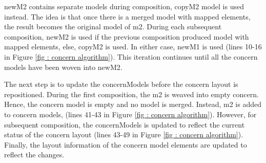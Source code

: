 newM2 contains separate models during composition, copyM2 model is used instead. The idea is that once there is a merged model with mapped elements, the result becomes the original model of m2. During each subsequent composition, newM2 is used if the previous composition produced model with mapped elements, else, copyM2 is used. In either case, newM1 is used (lines 10-16 in Figure  \ref{fig : concern algorithm}). This iteration continues until all the concern models have been woven into newM2.

The next step is to update the concernModels before the concern layout is repositioned. During the first composition, the m2 is weaved into empty concern. Hence, the concern model is empty and no model is merged. Instead, m2 is added to concern models, (lines 41-43 in Figure  \ref{fig : concern algorithm}). However, for subsequent composition, the concernModels is updated to reflect the current status of the concern layout (lines 43-49 in Figure  \ref{fig : concern algorithm}). Finally, the layout information of the concern model elements are updated to reflect the changes.

